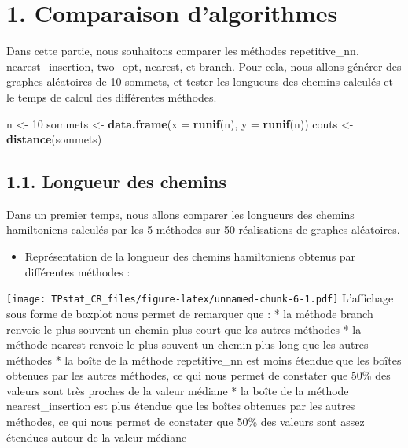 \documentclass[]{article}
\newenvironment{Shaded}{\begin{snugshade}}{\end{snugshade}}
\newcommand{\DataTypeTok}[1]{\textcolor[rgb]{0.13,0.29,0.53}{#1}}
\newcommand{\DecValTok}[1]{\textcolor[rgb]{0.00,0.00,0.81}{#1}}
\newcommand{\KeywordTok}[1]{\textcolor[rgb]{0.13,0.29,0.53}{\textbf{#1}}}
\newcommand{\NormalTok}[1]{#1}
\newcommand{\StringTok}[1]{\textcolor[rgb]{0.31,0.60,0.02}{#1}}
\providecommand{\tightlist}{%
  \setlength{\itemsep}{0pt}\setlength{\parskip}{0pt}}
\begin{document}
\hypertarget{comparaison-dalgorithmes}{%
\section{1. Comparaison d'algorithmes}\label{comparaison-dalgorithmes}}

Dans cette partie, nous souhaitons comparer les méthodes repetitive\_nn,
nearest\_insertion, two\_opt, nearest, et branch. Pour cela, nous allons
générer des graphes aléatoires de 10 sommets, et tester les longueurs
des chemins calculés et le temps de calcul des différentes méthodes.

\begin{Shaded}
\begin{Highlighting}[]
\NormalTok{      n <-}\StringTok{ }\DecValTok{10}
\NormalTok{sommets <-}\StringTok{ }\KeywordTok{data.frame}\NormalTok{(}\DataTypeTok{x =} \KeywordTok{runif}\NormalTok{(n), }\DataTypeTok{y =} \KeywordTok{runif}\NormalTok{(n))}
\NormalTok{  couts <-}\StringTok{ }\KeywordTok{distance}\NormalTok{(sommets)}
\end{Highlighting}
\end{Shaded}

\hypertarget{longueur-des-chemins}{%
\subsection{1.1. Longueur des chemins}\label{longueur-des-chemins}}

Dans un premier temps, nous allons comparer les longueurs des chemins
hamiltoniens calculés par les 5 méthodes sur 50 réalisations de graphes
aléatoires.

\begin{itemize}
\tightlist
\item
  Représentation de la longueur des chemins hamiltoniens obtenus par
  différentes méthodes :
\end{itemize}

\texttt{[image: TPstat\_CR\_files/figure-latex/unnamed-chunk-6-1.pdf]}
L'affichage sous forme de boxplot nous permet de remarquer que : * la
méthode branch renvoie le plus souvent un chemin plus court que les
autres méthodes * la méthode nearest renvoie le plus souvent un chemin
plus long que les autres méthodes * la boîte de la méthode
repetitive\_nn est moins étendue que les boîtes obtenues par les autres
méthodes, ce qui nous permet de constater que 50\% des valeurs sont très
proches de la valeur médiane * la boîte de la méthode nearest\_insertion
est plus étendue que les boîtes obtenues par les autres méthodes, ce qui
nous permet de constater que 50\% des valeurs sont assez étendues autour
de la valeur médiane
\end{document}
